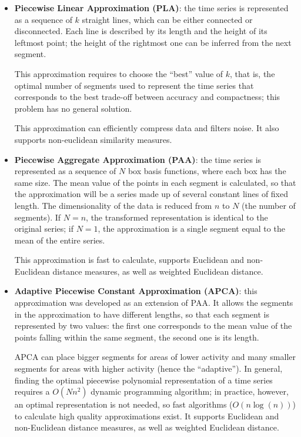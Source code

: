 \begin{itemize}
    \item \textbf{Piecewise Linear Approximation (PLA)}: the time series is represented as a sequence of $k$ straight lines, which can be either connected or disconnected. Each line is described by its length and the height of its leftmost point; the height of the rightmost one can be inferred from the next segment.
    
    This approximation requires to choose the ``best'' value of $k$, that is, the optimal number of segments used to represent the time series that corresponds to the best trade-off between accuracy and compactness; this problem has no general solution.

    This approximation can efficiently compress data and filters noise. It also supports non-euclidean similarity measures.

    \item \textbf{Piecewise Aggregate Approximation (PAA)}: the time series is represented as a sequence of $N$ box basis functions, where each box has the same size. The mean value of the points in each segment is calculated, so that the approximation will be a series made up of several constant lines of fixed length. The dimensionality of the data is reduced from $n$ to $N$ (the number of segments). If $N=n$, the transformed representation is identical to the original series; if $N=1$, the approximation is a single segment equal to the mean of the entire series.

    This approximation is fast to calculate, supports Euclidean and non-Euclidean distance measures, as well as weighted Euclidean distance.
    
    \item \textbf{Adaptive Piecewise Constant Approximation (APCA)}: this approximation was developed as an extension of PAA. It allows the segments in the approximation to have different lengths, so that each segment is represented by two values: the first one corresponds to the mean value of the points falling within the same segment, the second one is its length.

    APCA can place bigger segments for areas of lower activity and many smaller segments for areas with higher activity (hence the ``adaptive''). In general, finding the optimal piecewise polynomial representation of a time series requires a $O(Nn^2)$ dynamic programming algorithm; in practice, however, an optimal representation is not needed, so fast algorithms ($O(n \log(n))$) to calculate high quality approximations exist. It supports Euclidean and non-Euclidean distance measures, as well as weighted Euclidean distance.


\end{itemize}
